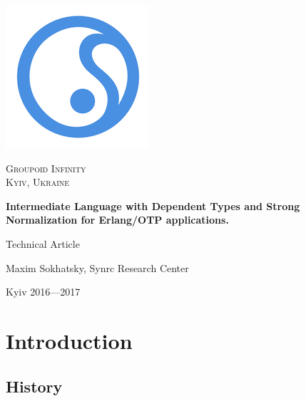 \documentclass[11pt,oneside]{article}
\begin{document}
\thispagestyle{empty}
\begin{center}

\begin{minipage}[t]{2cm}
    \includegraphics[scale=0.4]{img/S}
\end{minipage}
\begin{minipage}[t]{12cm}
    \begin{flushright}
        \textsc{{\Large Groupoid Infinity}}\\
        \textsc{Kyiv, Ukraine}\\
    \end{flushright}
\end{minipage}

\vspace{3cm}
\vspace{3cm}   {\Large \bf Intermediate Language with Dependent Types and Strong Normalization for Erlang/OTP applications.\\}\par
\vspace{0.3cm} {\Large Technical Article\par}
\vspace{0.3cm} {\Large Maxim Sokhatsky, Synrc Research Center\par}
\vspace{4cm}   {\Large Kyiv 2016---2017}

\end{center}

\newpage
\vspace{2cm}
\tableofcontents

\newpage
\section{Introduction}

\vspace{1cm}

\subsection{History}
\end{document}
